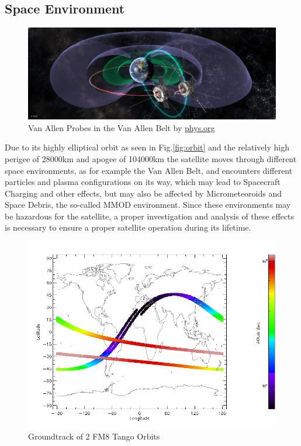 \subsection{Space Environment}

\begin{figure}[h]
	\centering
	\includegraphics[width=\linewidth+5em]{images/mysteriesofe}
		\caption{Van Allen Probes in the Van Allen Belt by \href{http://cdn.phys.org/newman/gfx/news/hires/2013/mysteriesofe.jpg}{phys.org}}
	\label{fig:worldmap}
\end{figure}

Due to its highly elliptical orbit as seen in Fig.\ref{fig:orbit} and the relatively high perigee of 28000km and apogee of 104000km the satellite moves through different space environments, as for example the Van Allen Belt, and encounters different particles and plasma configurations on its way, which may lead to Spacecraft Charging and other effects, but may also be affected by Micrometeoroids and Space Debris, the so-called MMOD environment. Since these environments may be hazardous for the satellite, a proper investigation and analysis of these effects is necessary to ensure a proper satellite operation during its lifetime.

\begin{figure}[H]
	\centering
	\includegraphics[width=\linewidth-15em]{spenvis/worldmap_2_orb}
		\caption{Groundtrack of 2 FM8 Tango Orbits}
	\label{fig:worldmap}
\end{figure}

